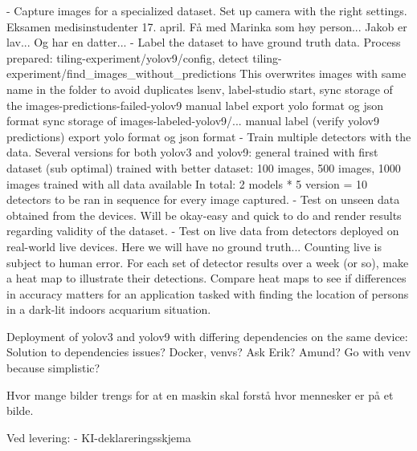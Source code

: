 - Capture images for a specialized dataset.
	Set up camera with the right settings.
	Eksamen medisinstudenter 17. april.
		Få med Marinka som høy person...
		Jakob er lav... Og har en datter...
- Label the dataset to have ground truth data.
	Process prepared: 
		tiling-experiment/yolov9/config, detect
		tiling-experiment/find_images_without_predictions
			This overwrites images with same name in the folder to avoid duplicates
		lsenv, 
		label-studio start, 
		sync storage of the images-predictions-failed-yolov9
		manual label
		export yolo format og json format
		sync storage of images-labeled-yolov9/... 
		manual label (verify yolov9 predictions)
		export yolo format og json format
- Train multiple detectors with the data.
	Several versions for both yolov3 and yolov9:
		general
		trained with first dataset (sub optimal) 
		trained with better dataset:
			100 images, 500 images, 1000 images
		trained with all data available
	In total: 2 models * 5 version = 10 detectors to be ran in sequence for every image captured. 
- Test on unseen data obtained from the devices.
	Will be okay-easy and quick to do and render results regarding validity of the dataset. 
- Test on live data from detectors deployed on real-world live devices.
	Here we will have no ground truth... Counting live is subject to human error. 
	For each set of detector results over a week (or so), make a heat map to illustrate their detections. 
	Compare heat maps to see if differences in accuracy matters for an application tasked with finding the location of persons in a dark-lit indoors acquarium situation.

	Deployment of yolov3 and yolov9 with differing dependencies on the same device:
	Solution to dependencies issues? Docker, venvs?	Ask Erik? Amund? Go with venv because simplistic?

Hvor mange bilder trengs for at en maskin skal forstå hvor mennesker er på et bilde.



Ved levering:
- KI-deklareringsskjema